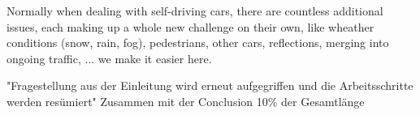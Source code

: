 Normally when dealing with self-driving cars, there are countless additional issues, each making up a whole new challenge on their own, like wheather conditions (snow, rain, fog), pedestrians, other cars, reflections, merging into ongoing traffic, ...
we make it easier here.

"Fragestellung aus der Einleitung wird erneut aufgegriffen und die Arbeitsschritte
werden resümiert"
Zusammen mit der Conclusion 10\% der Gesamtlänge



